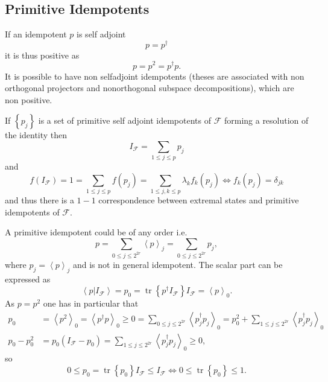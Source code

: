 \documentclass[aps,preprint]{revtex4}%
\begin{document}
\subsection{Primitive Idempotents}

If an idempotent $p$ is self adjoint
\begin{equation}
p=p^{\dagger}%
\end{equation}
it is thus positive as
\begin{equation}
p=p^{2}=p^{\dagger}p.
\end{equation}
It is possible to have non selfadjoint idempotents (theses are associated with
non orthogonal projectors and nonorthogonal subspace decompositions), which
are non positive.

If $\left\{  p_{j}\right\}  $ is a set of primitive self adjoint idempotents
of $\mathcal{F}$ forming a resolution of the identity then
\begin{equation}
I_{\mathcal{F}}=\sum_{1\leq j\leq p}p_{j}%
\end{equation}
and
\begin{equation}
f\left(  I_{\mathcal{F}}\right)  =1=\sum_{1\leq j\leq p}f\left(  p_{j}\right)
=\sum_{1\leq j,k\leq p}\lambda_{k}f_{k}\left(  p_{j}\right)  \Leftrightarrow
f_{k}\left(  p_{j}\right)  =\delta_{jk}%
\end{equation}
and thus there is a $1-1$ correspondence between extremal states and primitive
idempotents of $\mathcal{F}.$

A primitive idempotent could be of any order i.e.
\begin{equation}
p=\sum_{0\leq j\leq2^{2r}}\left\langle p\right\rangle _{j}=\sum_{0\leq
j\leq2^{2r}}p_{j},
\end{equation}
where $p_{j}=\left\langle p\right\rangle _{j}$ and is not in general
idempotent. The scalar part can be expressed as
\begin{equation}
\left\langle \left.  p\right\vert I_{\mathcal{F}}\right\rangle =p_{0}%
=\operatorname*{tr}\left\{  p^{\dagger}I_{\mathcal{F}}\right\}  I_{\mathcal{F}%
}=\left\langle p\right\rangle _{0}.
\end{equation}
As $p=p^{2}$ one has in particular that
\begin{align}
p_{0} &  =\left\langle p^{2}\right\rangle _{0}=\left\langle p^{\dagger
}p\right\rangle _{0}\geq0=\sum_{0\leq j\leq2^{2r}}\left\langle p_{j}^{\dagger
}p_{j}\right\rangle _{0}=p_{0}^{2}+\sum_{1\leq j\leq2^{2r}}\left\langle
p_{j}^{\dagger}p_{j}\right\rangle _{0}\\
p_{0}-p_{0}^{2} &  =p_{0}\left(  I_{\mathcal{F}}-p_{0}\right)  =\sum_{1\leq
j\leq2^{2r}}\left\langle p_{j}^{\dagger}p_{j}\right\rangle _{0}\geq0,
\end{align}
so
\begin{equation}
0\leq p_{0}=\operatorname*{tr}\left\{  p_{0}\right\}  I_{\mathcal{F}}\leq
I_{\mathcal{F}}\Longleftrightarrow0\leq\operatorname*{tr}\left\{
p_{0}\right\}  \leq1.
\end{equation}
\end{document}
